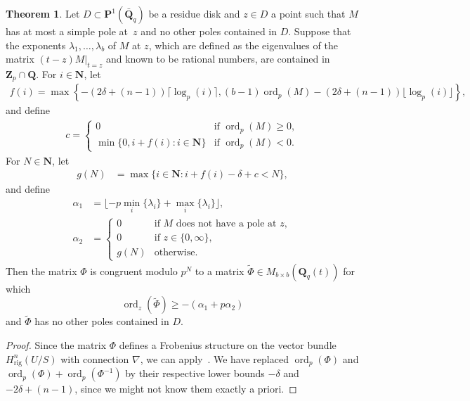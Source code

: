 \documentclass[a4paper,11pt]{article}
\numberwithin{equation}{section}
\newcommand{\NN}{\mathbf{N}} %
\newcommand{\ZZ}{\mathbf{Z}} %
\newcommand{\QQ}{\mathbf{Q}} %
\DeclareMathOperator{\ord}{ord}          %
\providecommand{\Hrig}{H_{\text{rig}}}  %
\theoremstyle{definition}
\newtheorem{thm}{Theorem}[section]
\begin{document}
\begin{thm} \label{thm:KedlayaTuitman}
Let $D \subset \mathbf{P}^1(\bar{\QQ}_q)$ be a residue disk and
$z \in D$ a point such that $M$ has at most a simple pole at~$z$ 
and no other poles contained in $D$. Suppose that 
the exponents $\lambda_1, \dotsc, \lambda_{b}$ of $M$ at $z$, which are defined 
as the eigenvalues  of the matrix $(t - z) M \vert_{t=z}$ and 
known to be rational numbers, are contained in $\ZZ_p \cap \QQ$. 
For $i \in \NN$, let 
\begin{align*}
f(i) = \max \left\{ -\left(2 \delta + (n-1) \right) \lceil \log_p(i) \rceil, 
(b-1) \ord_p(M) -\left(2 \delta + (n-1) \right) \lfloor \log_p(i) \rfloor 
\right\},
\end{align*}
and define 
\begin{align*}
c = \begin{cases}
0 & \mbox{if $\ord_p(M) \geq 0$}, \\
\min\{0, i + f(i): i \in \NN\} & \mbox{if $\ord_p(M) < 0$}.
\end{cases}
\end{align*}
For $N \in \NN$, let 
\begin{align*}
g(N) &= \max \{i \in \NN : i + f(i) - \delta + c  < N \},
\end{align*}
and define
\begin{align*}
\alpha_1    &= \lfloor -p \min_i \{ \lambda_i \} + \max_{i} \{\lambda_i\} \rfloor, \\ 
\alpha_2    &=  \left \{ 
         \begin{array}{cl}
         0  & \mbox{if $M$ does not have a pole at $z$},  \\
         0  & \mbox{if $z \in \{0,\infty \}$}, \\
         g(N) & \mbox{otherwise}.
         \end{array}
         \right.
\end{align*}
Then the matrix $\Phi$ is congruent 
modulo $p^{N}$ to a matrix $\tilde{\Phi} \in M_{b \times b}(\QQ_q(t))$ for which
\begin{equation*}
\ord_z\left(\tilde{\Phi}\right) \geq -(\alpha_1+p \alpha_2)
\end{equation*}
and $\tilde{\Phi}$ has no other poles contained in $D$.
\end{thm}

\begin{proof}
Since the matrix $\Phi$ defines a Frobenius structure on the vector 
bundle $\Hrig^n(U/S)$ with connection $\nabla$, we can 
apply~\citep[Theorem~2.1]{KedlayaTuitman2012}. We have 
replaced $\ord_p\left(\Phi\right)$ and $\ord_p\left(\Phi\right)+\ord_p\left(\Phi^{-1}\right)$ 
by their respective lower bounds $-\delta$ and $-2 \delta + (n-1)$, since 
we might not know them exactly a priori.
\end{proof}
\end{document}
